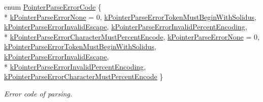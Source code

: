 \begin{DoxyCompactItemize}
\item 
enum \hyperlink{group___r_a_p_i_d_j_s_o_n___e_r_r_o_r_s_gacb2e274f33e54d91b96e9883a99a98be}{Pointer\+Parse\+Error\+Code} \{ \\*
\hyperlink{group___r_a_p_i_d_j_s_o_n___e_r_r_o_r_s_ggacb2e274f33e54d91b96e9883a99a98bea81e2b6fbd1bf4ac890ddb7779265e3a0}{k\+Pointer\+Parse\+Error\+None} = 0, 
\hyperlink{group___r_a_p_i_d_j_s_o_n___e_r_r_o_r_s_ggacb2e274f33e54d91b96e9883a99a98bea5821696a2ab6cbccdc8288cbe6e81c77}{k\+Pointer\+Parse\+Error\+Token\+Must\+Begin\+With\+Solidus}, 
\hyperlink{group___r_a_p_i_d_j_s_o_n___e_r_r_o_r_s_ggacb2e274f33e54d91b96e9883a99a98bea4d2a7e511d717fd1d2f532ef5fcf821b}{k\+Pointer\+Parse\+Error\+Invalid\+Escape}, 
\hyperlink{group___r_a_p_i_d_j_s_o_n___e_r_r_o_r_s_ggacb2e274f33e54d91b96e9883a99a98beac0c1b013c0db34dcc5a47fc1ee7a8c35}{k\+Pointer\+Parse\+Error\+Invalid\+Percent\+Encoding}, 
\\*
\hyperlink{group___r_a_p_i_d_j_s_o_n___e_r_r_o_r_s_ggacb2e274f33e54d91b96e9883a99a98beabd7eae93627f74267009a03679b6dc38}{k\+Pointer\+Parse\+Error\+Character\+Must\+Percent\+Encode}, 
\hyperlink{group___r_a_p_i_d_j_s_o_n___e_r_r_o_r_s_ggacb2e274f33e54d91b96e9883a99a98bea81e2b6fbd1bf4ac890ddb7779265e3a0}{k\+Pointer\+Parse\+Error\+None} = 0, 
\hyperlink{group___r_a_p_i_d_j_s_o_n___e_r_r_o_r_s_ggacb2e274f33e54d91b96e9883a99a98bea5821696a2ab6cbccdc8288cbe6e81c77}{k\+Pointer\+Parse\+Error\+Token\+Must\+Begin\+With\+Solidus}, 
\hyperlink{group___r_a_p_i_d_j_s_o_n___e_r_r_o_r_s_ggacb2e274f33e54d91b96e9883a99a98bea4d2a7e511d717fd1d2f532ef5fcf821b}{k\+Pointer\+Parse\+Error\+Invalid\+Escape}, 
\\*
\hyperlink{group___r_a_p_i_d_j_s_o_n___e_r_r_o_r_s_ggacb2e274f33e54d91b96e9883a99a98beac0c1b013c0db34dcc5a47fc1ee7a8c35}{k\+Pointer\+Parse\+Error\+Invalid\+Percent\+Encoding}, 
\hyperlink{group___r_a_p_i_d_j_s_o_n___e_r_r_o_r_s_ggacb2e274f33e54d91b96e9883a99a98beabd7eae93627f74267009a03679b6dc38}{k\+Pointer\+Parse\+Error\+Character\+Must\+Percent\+Encode}
 \}\begin{DoxyCompactList}\small\item\em Error code of parsing. \end{DoxyCompactList}
\end{DoxyCompactItemize}

